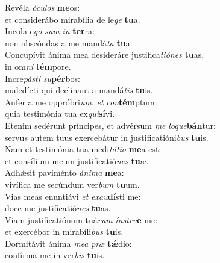 \evenverse Revéla \textit{ó}\textit{cu}\textit{los} \textbf{me}os:~\*\\
\evenverse et considerábo mirabília de le\textit{ge} \textbf{tu}a.\\
\oddverse Incola e\textit{go} \textit{sum} \textit{in} \textbf{ter}ra:~\*\\
\oddverse non abscóndas a me mandá\textit{ta} \textbf{tu}a.\\
\evenverse Concupívit ánima mea desideráre justifica\textit{ti}\textit{ó}\textit{nes} \textbf{tu}as,~\*\\
\evenverse in om\textit{ni} \textbf{tém}pore.\\
\oddverse Incre\textit{pá}\textit{sti} \textit{su}\textbf{pér}bos:~\*\\
\oddverse maledícti qui declínant a mandá\textit{tis} \textbf{tu}is.\\
\evenverse Aufer a me oppróbri\textit{um}, \textit{et} \textit{con}\textbf{tém}ptum:~\*\\
\evenverse quia testimónia tua ex\textit{qui}\textbf{sí}vi.\\
\oddverse Etenim sedérunt príncipes, et advérsum \textit{me} \textit{lo}\textit{que}\textbf{bán}tur:~\*\\
\oddverse servus autem tuus exercebátur in justificatióni\textit{bus} \textbf{tu}is.\\
\evenverse Nam et testimónia tua medi\textit{tá}\textit{ti}\textit{o} \textbf{me}a est:~\*\\
\evenverse et consílium meum justificatió\textit{nes} \textbf{tu}æ.\\
\oddverse Adhǽsit paviménto \textit{á}\textit{ni}\textit{ma} \textbf{me}a:~\*\\
\oddverse vivífica me secúndum ver\textit{bum} \textbf{tu}um.\\
\evenverse Vias meas enuntiávi \textit{et} \textit{e}\textit{xau}\textbf{dí}sti me:~\*\\
\evenverse doce me justificatió\textit{nes} \textbf{tu}as.\\
\oddverse Viam justificatiónum tuá\textit{rum} \textit{ín}\textit{stru}\textbf{e} me:~\*\\
\oddverse et exercébor in mirabíli\textit{bus} \textbf{tu}is.\\
\evenverse Dormitávit ánima \textit{me}\textit{a} \textit{præ} \textbf{tǽ}dio:~\*\\
\evenverse confírma me in ver\textit{bis} \textbf{tu}is.\\
